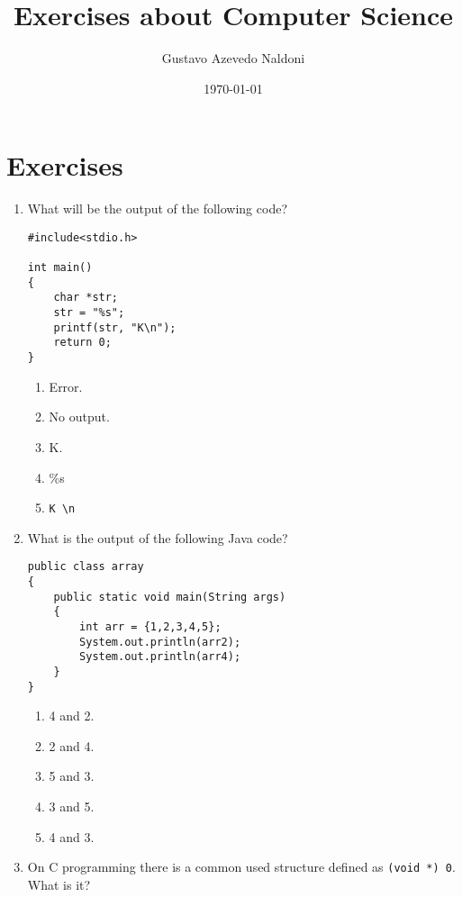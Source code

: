 \documentclass{article}
\title{Exercises about Computer Science}
\author{Gustavo Azevedo Naldoni}
\date{\today}
\begin{document}

\maketitle
\section{Exercises}
\begin{enumerate}
\item What will be the output of the following code?

            \begin{verbatim}
#include<stdio.h>

int main()
{
    char *str;
    str = "%s";
    printf(str, "K\n");
    return 0;
}
            \end{verbatim}
    
            \begin{enumerate}
                \item Error.
                \item No output.
                \item K.
                \item \%s
                \item \begin{verbatim}K \n \end{verbatim}
            \end{enumerate}
\item What is the output of the following Java code?

            \begin{verbatim}
public class array
{
	public static void main(String args)
	{
		int arr = {1,2,3,4,5};
		System.out.println(arr2);
		System.out.println(arr4);
	}
}
            \end{verbatim}
    
            \begin{enumerate}
                \item 4 and 2.
                \item 2 and 4.
                \item 5 and 3.
                \item 3 and 5.
                \item 4 and 3.
            \end{enumerate}
\item On C programming there is a common used structure defined as \texttt{(void *) 0}. What is it?
    

\end{enumerate}
\end{document}
